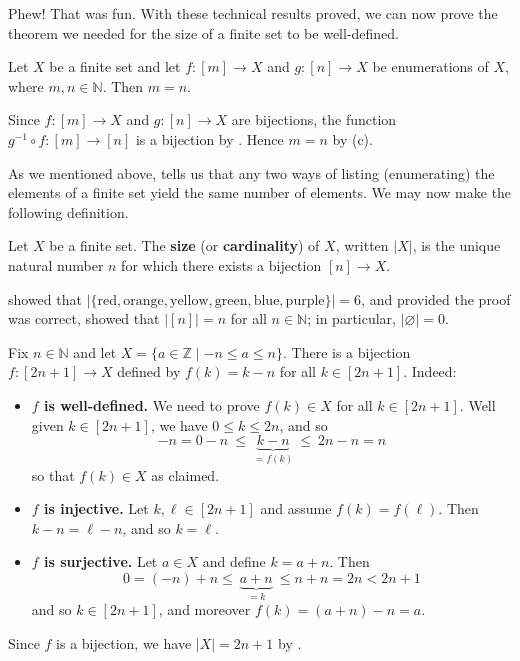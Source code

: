 Phew! That was fun. With these technical results proved, we can now prove the theorem we needed for the size of a finite set to be well-defined.

\begin{theorem}
\label{thmUniquenessOfSize}
Let $X$ be a finite set and let $f : [m] \to X$ and $g : [n] \to X$ be enumerations of $X$, where $m,n \in \mathbb{N}$. Then $m=n$.
\end{theorem}

\begin{cproof}
Since $f : [m] \to X$ and $g : [n] \to X$ are bijections, the function $g^{-1} \circ f : [m] \to [n]$ is a bijection by . Hence $m=n$ by (c).
\end{cproof}

As we mentioned above,  tells us that any two ways of listing (enumerating) the elements of a finite set yield the same number of elements. We may now make the following definition.

\begin{definition}
\label{defSize}
Let $X$ be a finite set. The \textbf{size} (or \textbf{cardinality}) of $X$, written $|X|$, is the unique natural number $n$ for which there exists a bijection $[n] \to X$.
\end{definition}

\begin{example}
 showed that $|\{ \text{red}, \text{orange}, \text{yellow}, \text{green}, \text{blue}, \text{purple} \}| = 6$, and provided the proof was correct,  showed that $|[n]| = n$ for all $n \in \mathbb{N}$; in particular, $|\varnothing| = 0$.
\end{example}

\begin{example}
\label{exBijectionFromIntegersFromMinusNToNToBracketTwoNPlusOne}
Fix $n \in \mathbb{N}$ and let $X = \{ a \in \mathbb{Z} \mid -n \le a \le n \}$. There is a bijection $f : [2n+1] \to X$ defined by $f(k) = k-n$ for all $k \in [2n+1]$. Indeed:
\begin{itemize}
\item \textbf{$f$ is well-defined.}
We need to prove $f(k) \in X$ for all $k \in [2n+1]$. Well given $k \in [2n+1]$, we have $0 \le k \le 2n$, and so
\[ -n = 0-n ~ \le ~ \underbrace{k-n}_{=f(k)} ~ \le ~ 2n - n = n \]
so that $f(k) \in X$ as claimed.
\item \textbf{$f$ is injective.} Let $k, \ell \in [2n+1]$ and assume $f(k) = f(\ell)$. Then $k-n = \ell-n$, and so $k = \ell$.
\item \textbf{$f$ is surjective.} Let $a \in X$ and define $k = a+n$. Then
\[ 0 = (-n) + n \le ~ \underbrace{a + n}_{= k} ~ \le n + n = 2n < 2n+1 \]
and so $k \in [2n+1]$, and moreover $f(k) = (a+n)-n = a$.
\end{itemize}
Since $f$ is a bijection, we have $|X| = 2n+1$ by .
\end{example}

